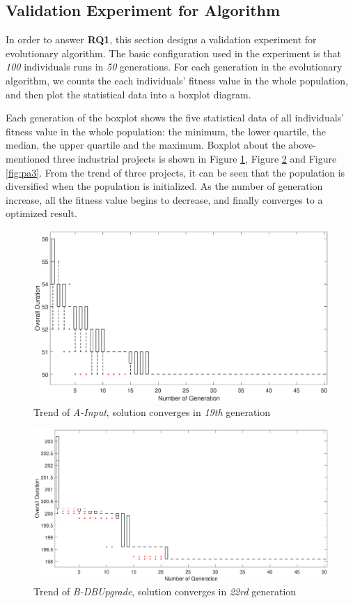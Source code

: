 \subsection{Validation Experiment for Algorithm}
%
In order to answer \textbf{RQ1}, this section designs a validation experiment
for evolutionary algorithm. The basic configuration used in the experiment is
that \emph{100} individuals runs in \emph{50} generations. For each generation
in the evolutionary algorithm, we counts the each individuals' fitness value in
the whole population, and then plot the statistical data into a boxplot diagram.


Each generation of the boxplot shows the five statistical data of all
individuals' fitness value in the whole population: the minimum, the lower
quartile, the median, the upper quartile and the maximum. Boxplot about the
above-mentioned three industrial projects is shown in Figure \ref{fig:pa1},
Figure \ref{fig:pa2} and Figure \ref{fig:pa3}. From the trend of three projects,
it can be seen that the population is diversified when the population is
initialized. As the number of generation increase, all the fitness value begins
to decrease, and finally converges to a optimized result.

\begin{figure}[!htb]
  \centering
  \includegraphics[width=\textwidth]{figures/fig_pa1.eps}
  \caption{Trend of \emph{A-Input}, solution converges in \emph{19th} generation}
  \label{fig:pa1}
\end{figure}

\begin{figure}[!htb]
  \centering
  \includegraphics[width=\textwidth]{figures/fig_pa2.eps}
  \caption{Trend of \emph{B-DBUpgrade}, solution converges in \emph{22rd} generation}
  \label{fig:pa2}
\end{figure}

